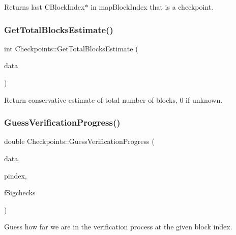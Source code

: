 Returns last C\+Block\+Index$\ast$ in map\+Block\+Index that is a checkpoint. 

\mbox{\label{namespace_checkpoints_a9688af1d9779e0d79a3d1d29f7a816fb}} 
\subsubsection{\texorpdfstring{Get\+Total\+Blocks\+Estimate()}{GetTotalBlocksEstimate()}}
{\footnotesize\ttfamily int Checkpoints\+::\+Get\+Total\+Blocks\+Estimate (\begin{DoxyParamCaption}\item[{const \mbox{\hyperlink{struct_checkpoints_1_1_c_checkpoint_data}{C\+Checkpoint\+Data}} \&}]{data }\end{DoxyParamCaption})}



Return conservative estimate of total number of blocks, 0 if unknown. 

\mbox{\label{namespace_checkpoints_aa2e60b5114a431ccaff32a6e1f418af1}} 
\subsubsection{\texorpdfstring{Guess\+Verification\+Progress()}{GuessVerificationProgress()}}
{\footnotesize\ttfamily double Checkpoints\+::\+Guess\+Verification\+Progress (\begin{DoxyParamCaption}\item[{const \mbox{\hyperlink{struct_checkpoints_1_1_c_checkpoint_data}{C\+Checkpoint\+Data}} \&}]{data,  }\item[{\mbox{\hyperlink{class_c_block_index}{C\+Block\+Index}} $\ast$}]{pindex,  }\item[{bool}]{f\+Sigchecks }\end{DoxyParamCaption})}



Guess how far we are in the verification process at the given block index. 



